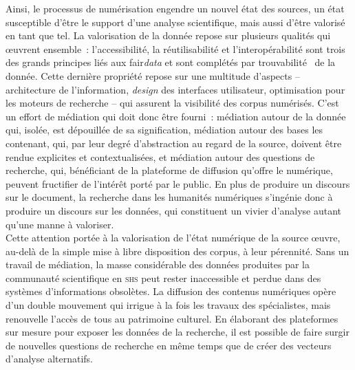\documentclass[a4paper,12pt,twoside]{book}
\newcommand{\eng}{\emph}
\newcommand{\shs}{\textsc{shs}\xspace}
\newcommand{\g}[1]{\og#1~\fg}
\newcommand{\fair}{\gls{fair}\xspace}
\begin{document}
Ainsi, le processus de numérisation engendre un nouvel état des sources, un état susceptible d'être le support d'une analyse scientifique, mais aussi d'être valorisé en tant que tel. La valorisation de la donnée repose sur plusieurs qualités qui œuvrent ensemble~: l'accessibilité, la réutilisabilité et l'interopérabilité sont trois des grands principes liés aux \fair \eng{data} et sont complétés par \g{trouvabilité} de la donnée. Cette dernière propriété repose sur une multitude d'aspects – architecture de l'information, \eng{design} des interfaces utilisateur, optimisation pour les moteurs de recherche – qui assurent la visibilité des corpus numérisés. C'est un effort de médiation qui doit donc être fourni~: médiation autour de la donnée qui, isolée, est dépouillée de sa signification, médiation autour des bases les contenant, qui, par leur degré d'abstraction au regard de la source, doivent être rendue explicites et contextualisées, et médiation autour des questions de recherche, qui, bénéficiant de la plateforme de diffusion qu'offre le numérique, peuvent fructifier de l'intérêt porté par le public. En plus de produire un discours sur le document, la recherche dans les humanités numériques s'ingénie donc à produire un discours sur les données, qui constituent un vivier d'analyse autant qu'une manne à valoriser.\\

Cette attention portée à la valorisation de l'état numérique de la source œuvre, au-delà de la simple mise à libre disposition des corpus, à leur pérennité. Sans un travail de médiation, la masse considérable des données produites par la communauté scientifique en \shs peut rester inaccessible et perdue dans des systèmes d'informations obsolètes. La diffusion des contenus numériques opère d'un double mouvement qui irrigue à la fois les travaux des spécialistes, mais renouvelle l'accès de tous au patrimoine culturel. En élaborant des plateformes sur mesure pour exposer les données de la recherche, il est possible de faire surgir de nouvelles questions de recherche en même temps que de créer des vecteurs d'analyse alternatifs.\\
\end{document}
